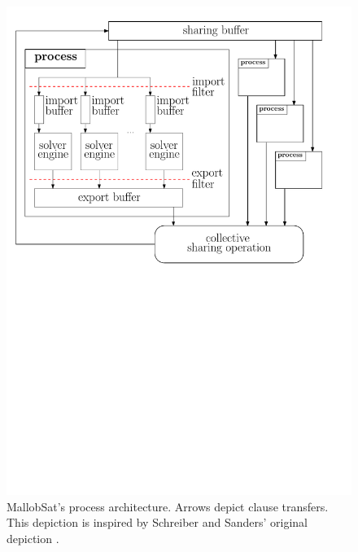 \documentclass[12pt,a4paper,twoside]{scrartcl}
\numberwithin{equation}{section}
\begin{document}
\begin{figure}
  \center
  \includegraphics[scale=.8]{figures/mallob_architecture.pdf}
  \caption{MallobSat's process architecture. Arrows depict clause transfers. This depiction is inspired by Schreiber and Sanders' original depiction \cite{mallobSat}.}
  \label{fig:architectureMallob}
\end{figure}
\end{document}
